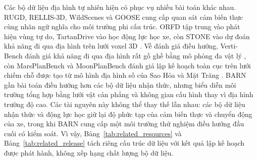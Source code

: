 \documentclass[11pt]{article}
\begin{document}
Các bộ dữ liệu địa hình tự nhiên hiện có phục vụ nhiều bài toán khác nhau. RUGD,
RELLIS-3D, WildScenes và GOOSE cung cấp quan sát cảm biến thực cùng nhãn ngữ
nghĩa cho môi trường phi cấu trúc\cite{rugd,rellis3d,wildscenes,goose}. ORFD
tập trung vào phát hiện vùng tự do, TartanDrive vào học động lực học xe, còn
STONE vào dự đoán khả năng đi qua địa hình trên lưới voxel 3D
\cite{orfd,tartandrive,stone}. Về đánh giá điều hướng, Verti-Bench đánh giá
khả năng đi qua địa hình rất gồ ghề bằng mô phỏng đa vật lý
\cite{vertibench}, còn MarsPlanBench và MoonPlanBench đánh giá lập kế hoạch toàn
cục trên lưới chiếm chỗ được tạo từ mô hình địa hình số của Sao Hỏa và Mặt Trăng
\cite{planetarypathbench}. BARN gần bài toán điều hướng hơn các bộ dữ liệu nhận
thức, nhưng biểu diễn môi trường tổng hợp bằng lưới vật cản phẳng và không gian
cấu hình thay vì địa hình trường độ cao\cite{barn}. Các tài nguyên này không thể
thay thế lẫn nhau: các bộ dữ liệu nhận thức và động lực học giữ lại độ phức tạp
của cảm biến thực và chuyển động của xe, trong khi BARN cung cấp một môi trường thử nghiệm điều hướng
đầu cuối có kiểm soát. Vì vậy, Bảng~\ref{tab:related_resources} và
Bảng~\ref{tab:related_release} tách riêng cấu trúc dữ liệu với kết quả lập kế
hoạch được phát hành, không xếp hạng chất lượng bộ dữ liệu.
\end{document}
